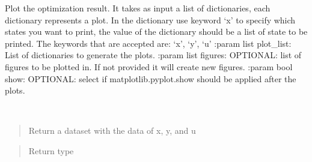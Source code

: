 \documentclass[letterpaper,10pt,english]{sphinxmanual}
\begin{document}
\begin{fulllineitems}

\begin{fulllineitems}
\label{\detokenize{yaocptool.methods.base:yaocptool.methods.base.optimizationresult.OptimizationResult.is_valid}}
\end{fulllineitems}


\begin{fulllineitems}
\label{\detokenize{yaocptool.methods.base:yaocptool.methods.base.optimizationresult.OptimizationResult.plot}}
Plot the optimization result.
It takes as input a list of dictionaries, each dictionary represents a plot.  In the dictionary use keyword ‘x’
to specify which states you want to print, the value of the dictionary should be a list of state to be printed.
The keywords that are accepted are: ‘x’, ‘y’, ‘u’
:param list plot\_list: List of dictionaries to generate the plots.
:param list figures: OPTIONAL: list of figures to be plotted in. If not provided it will create new figures.
:param bool show: OPTIONAL: select if matplotlib.pyplot.show should be applied after the plots.

\end{fulllineitems}


\begin{fulllineitems}
\label{\detokenize{yaocptool.methods.base:yaocptool.methods.base.optimizationresult.OptimizationResult.to_dataset}}~\begin{quote}

Return a dataset with the data of x, y, and u
\end{quote}
\begin{quote}\begin{description}
\item[{Return type}] \leavevmode
{\hyperref[\detokenize{yaocptool.modelling:yaocptool.modelling.dataset.DataSet}]{}}

\end{description}\end{quote}

\end{fulllineitems}


\end{fulllineitems}
\end{document}
